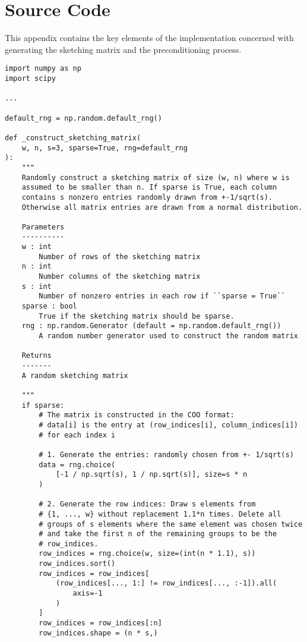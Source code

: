 \chapter{Source Code}

This appendix contains the key elements of the implementation concerned with generating the sketching matrix and the preconditioning process.

\begin{verbatim}
import numpy as np
import scipy

...

default_rng = np.random.default_rng()

def _construct_sketching_matrix(
    w, n, s=3, sparse=True, rng=default_rng
):
    """
    Randomly construct a sketching matrix of size (w, n) where w is
    assumed to be smaller than n. If sparse is True, each column
    contains s nonzero entries randomly drawn from +-1/sqrt(s).
    Otherwise all matrix entries are drawn from a normal distribution.

    Parameters
    ----------
    w : int
        Number of rows of the sketching matrix
    n : int
        Number columns of the sketching matrix
    s : int
        Number of nonzero entries in each row if ``sparse = True``
    sparse : bool
        True if the sketching matrix should be sparse.
    rng : np.random.Generator (default = np.random.default_rng())
        A random number generator used to construct the random matrix

    Returns
    -------
    A random sketching matrix

    """
    if sparse:
        # The matrix is constructed in the COO format:
        # data[i] is the entry at (row_indices[i], column_indices[i])
        # for each index i

        # 1. Generate the entries: randomly chosen from +- 1/sqrt(s)
        data = rng.choice(
            [-1 / np.sqrt(s), 1 / np.sqrt(s)], size=s * n
        )

        # 2. Generate the row indices: Draw s elements from
        # {1, ..., w} without replacement 1.1*n times. Delete all
        # groups of s elements where the same element was chosen twice
        # and take the first n of the remaining groups to be the
        # row_indices.
        row_indices = rng.choice(w, size=(int(n * 1.1), s))
        row_indices.sort()
        row_indices = row_indices[
            (row_indices[..., 1:] != row_indices[..., :-1]).all(
                axis=-1
            )
        ]
        row_indices = row_indices[:n]
        row_indices.shape = (n * s,)


\end{verbatim}

